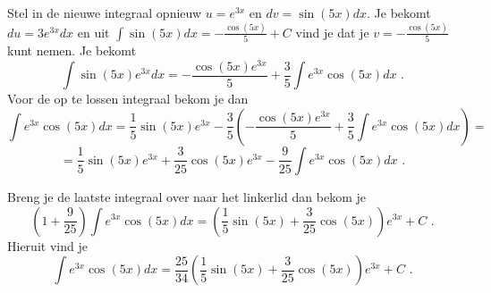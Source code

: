 \documentclass{article}
\begin{document}
Stel in de nieuwe integraal opnieuw $u=e^{3x}$ en $dv=\sin (5x)dx$.
Je bekomt $du=3e^{3x}dx$ en uit $\int \sin (5x)dx=-\frac {\cos (5x)}{5}+C$ vind je dat je $v=-\frac {\cos (5x)}{5}$ kunt nemen.
Je bekomt
\[
\int \sin (5x)e^{3x}dx=-\frac {\cos (5x)e^{3x}}{5}+\frac{3}{5}\int e^{3x}\cos (5x)dx \text { .}
\]
Voor de op te lossen integraal bekom je dan
\[
\int e^{3x}\cos (5x)dx=\frac{1}{5}\sin (5x)e^{3x}-\frac{3}{5} \left(  -\frac {\cos (5x)e^{3x}}{5}+\frac{3}{5}\int e^{3x}\cos (5x)dx  \right)=
\]
\[
=\frac{1}{5}\sin (5x)e^{3x}+\frac{3}{25} \cos (5x)e^{3x}-\frac{9}{25}\int e^{3x}\cos (5x)dx \text { .}
\]

Breng je de laatste integraal over naar het linkerlid dan bekom je
\[
\left( 1+\frac{9}{25}  \right) \int e^{3x}\cos (5x)dx = \left(  \frac{1}{5}\sin (5x)+\frac{3}{25} \cos (5x)  \right)e^{3x}+C \text { .}
\]
Hieruit vind je
\[
\int e^{3x}\cos (5x)dx=\frac{25}{34} \left( \frac{1}{5}\sin (5x)+\frac{3}{25} \cos (5x)   \right)e^{3x}+C \text { .}
\]
\end{document}
